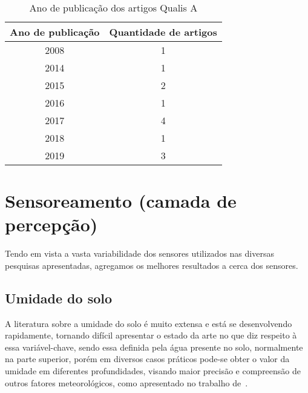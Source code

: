 \documentclass[
article,			%
12pt,				%
oneside,			%
a4paper,			%
english,			%
brazil,				%
sumario=tradicional
]{abntex2}
\begin{document}
\begin{table}[!htb]
  \centering
  \caption{Ano de publicação dos artigos Qualis A}
  \begin{tabular}{|c|c|}
    \hline
    \textbf{Ano de publicação} & \textbf{Quantidade de artigos} \\ \hline
    2008 & 1 \\ \hline
    2014 & 1 \\ \hline
    2015 & 2 \\ \hline
    2016 & 1 \\ \hline
    2017 & 4 \\ \hline
    2018 & 1 \\ \hline
    2019 & 3 \\ \hline
  \end{tabular}
\end{table}

%


\section{Sensoreamento (camada de percepção)}\label{Sensoreamento do solo (camada de percepção)}

Tendo em vista a vasta variabilidade dos sensores utilizados nas diversas pesquisas apresentadas, agregamos os melhores resultados a cerca dos sensores.

\subsection{Umidade do solo}\label{Umidade do solo}

A literatura sobre a umidade do solo é muito extensa e está se desenvolvendo rapidamente, tornando difícil apresentar o estado da arte\cite{11} no que diz respeito à essa variável-chave, sendo essa definida pela água presente no solo\cite{11}, normalmente na parte superior, porém em diversos casos práticos pode-se obter o valor da umidade em diferentes profundidades, visando maior precisão e compreensão de outros fatores meteorológicos, como apresentado no trabalho de~\citeauthor{12}.
\end{document}
